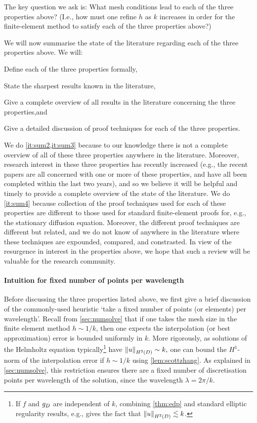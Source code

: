     The key question we ask is: What mesh conditions lead to each of the three properties above? (I.e., how must one refine $h$ as $k$ increases in order for the finite-element method to satisfy each of the three properties above?)

    We will now summarise the state of the literature regarding each of the three properties above. We will:
    \ben
  \item Define each of the three properties formally,
  \item\label{it:sum2} State the sharpest results known in the literature,
  \item\label{it:sum3} Give a complete overview of all results in the literature concerning the three properties,and
    \item\label{it:sum4} Give a detailed discussion of proof techniques for each of the three properties.
      \een

We do \cref{it:sum2,it:sum3} because to our knowledge there is not a complete overview of all of these three properties anywhere in the literature. Moreover, research interest in these three properties has recently increased (e.g., the recent papers \cite{ChNi:18,LiWu:18,ChGaNiTo:18,ChNi:19} are all concerned with one or more of these properties, and have all been completed within the last two years), and so we believe it will be helpful and timely to provide a complete overview of the state of the literature. We do \cref{it:sum4} because collection of the proof techniques used for each of these properties are different to those used for standard finite-element proofs for, e.g., the stationary diffusion equation. Moreover, the different proof techniques are different but related, and we do not know of anywhere in the literature where these techniques are expounded, compared, and constrasted. In view of the resurgence in interest in the properties above, we hope that such a review will be valuable for the research community.

      

\paragraph{Intuition for fixed number of points per wavelength} Before discussing the three properties listed above, we first give a brief discussion of the commonly-used heuristic `take a fixed number of points (or elements) per wavelength'.  Recall from \cref{sec:numsolve} that if one takes the mesh size in the finite element method $h \sim 1/k$, then one expects the interpolation (or best approximation) error is bounded uniformly in $k$. More rigorously, as solutions of the Helmholtz equation typically\footnote{If $f$ and $g_{D}$ are independent of $k$,  combining \cref{thm:edp} and standard elliptic regularity results, e.g., \cite[Theorems 4.16 and 4.18]{Mc:00} gives the fact that $\NHtD{u} \lesssim k$.} have $\NHtD{u} \sim k,$ one can bound the $H^1$-norm of the interpolation error if $h \sim 1/k$ using \cref{lem:scottzhang}.  As explained in \cref{sec:numsolve}, this restriction ensures there are a fixed number of discretisation points per wavelength of the solution, since the wavelength $\lambda = 2\pi/k.$

